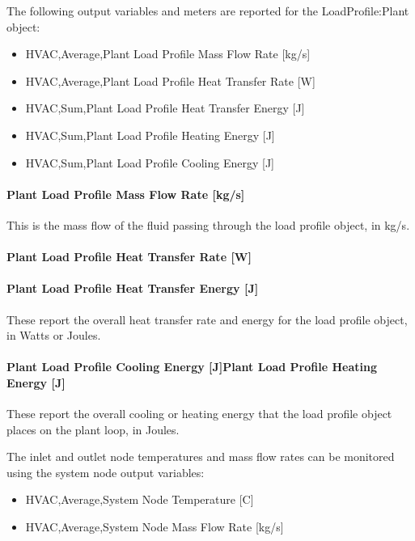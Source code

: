 The following output variables and meters are reported for the LoadProfile:Plant object:

\begin{itemize}
\item
  HVAC,Average,Plant Load Profile Mass Flow Rate {[}kg/s{]}
\item
  HVAC,Average,Plant Load Profile Heat Transfer Rate {[}W{]}
\item
  HVAC,Sum,Plant Load Profile Heat Transfer Energy {[}J{]}
\item
  HVAC,Sum,Plant Load Profile Heating Energy {[}J{]}
\item
  HVAC,Sum,Plant Load Profile Cooling Energy {[}J{]}
\end{itemize}

\paragraph{Plant Load Profile Mass Flow Rate {[}kg/s{]}}\label{plant-load-profile-mass-flow-rate-kgs}

This is the mass flow of the fluid passing through the load profile object, in kg/s.

\paragraph{Plant Load Profile Heat Transfer Rate {[}W{]}}\label{plant-load-profile-heat-transfer-rate-w}

\paragraph{Plant Load Profile Heat Transfer Energy {[}J{]}}\label{plant-load-profile-heat-transfer-energy-j}

These report the overall heat transfer rate and energy for the load profile object, in Watts or Joules.

\paragraph{Plant Load Profile Cooling Energy {[}J{]}Plant Load Profile Heating Energy {[}J{]}}\label{plant-load-profile-cooling-energy-jplant-load-profile-heating-energy-j}

These report the overall cooling or heating energy that the load profile object places on the plant loop, in Joules.

The inlet and outlet node temperatures and mass flow rates can be monitored using the system node output variables:

\begin{itemize}
\item
  HVAC,Average,System Node Temperature {[}C{]}
\item
  HVAC,Average,System Node Mass Flow Rate {[}kg/s{]}
\end{itemize}
